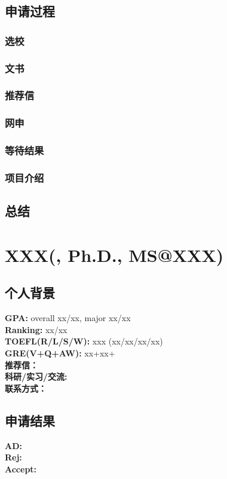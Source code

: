 \documentclass[a4paper,UTF8]{book}
\begin{document}
    \subsection*{申请过程}
        \subsubsection*{选校}
        \subsubsection*{文书}
        \subsubsection*{推荐信}
        \subsubsection*{网申}
        \subsubsection*{等待结果}
        \subsubsection*{项目介绍}

    \subsection*{总结}


\clearpage
\section{XXX(, Ph.D., MS@XXX)}
    \subsection*{个人背景}
        \textbf{GPA:} overall xx/xx, major xx/xx\\
        \textbf{Ranking:} xx/xx\\
        \textbf{TOEFL(R/L/S/W): }xxx (xx/xx/xx/xx)\\
        \textbf{GRE(V+Q+AW):} xx+xx+\\
        \textbf{推荐信：} \\
        \textbf{科研/实习/交流:} \\ 
        \textbf{联系方式：} 

    \subsection*{申请结果}
        \textbf{AD:} \\
        \textbf{Rej:} \\
        \textbf{Accept:} 
\end{document}
